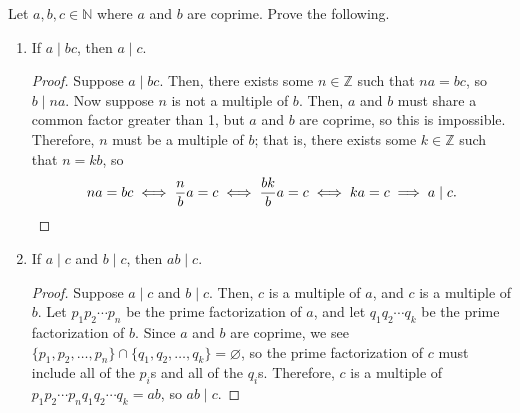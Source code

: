 \begin{exer}
Let $ a,b,c\in\mathbb{N} $ where $ a $ and $ b $ are coprime. Prove the following.

\begin{enumerate}

\item If $ a\mid bc $, then $ a\mid c $.
\begin{proof}
Suppose $ a\mid bc $. Then, there exists some $ n\in\mathbb{Z} $ such that $ na=bc $, so $ b\mid na $. Now suppose $ n $ is not a multiple of $ b $. Then, $ a $ and $ b $ must share a common factor greater than 1, but $ a $ and $ b $ are coprime, so this is impossible. Therefore, $ n $ must be a multiple of $ b $; that is, there exists some $ k\in\mathbb{Z} $ such that $ n=kb $, so
\begin{equation*}
    na=bc \iff \frac{n}{b}a=c \iff \frac{bk}{b}a=c \iff ka=c \implies a\mid c. \qedhere
\end{equation*}
\end{proof}

\item If $ a\mid c $ and $ b\mid c $, then $ ab\mid c $.
\begin{proof}
Suppose $ a\mid c $ and $ b\mid c $. Then, $ c $ is a multiple of $ a $, and $ c $ is a multiple of $ b $. Let $ p_1p_2\cdots p_n $ be the prime factorization of $ a $, and let $ q_1q_2\cdots q_k $ be the prime factorization of $ b $. Since $ a $ and $ b $ are coprime, we see $ \{p_1,p_2,\ldots,p_n\}\cap\{q_1,q_2,\ldots,q_k\}=\varnothing $, so the prime factorization of $ c $ must include all of the $ p_i $s and all of the $ q_i $s. Therefore, $ c $ is a multiple of $ p_1p_2\cdots p_nq_1q_2\cdots q_k=ab $, so $ ab\mid c $.
\end{proof}

\end{enumerate}
\end{exer}